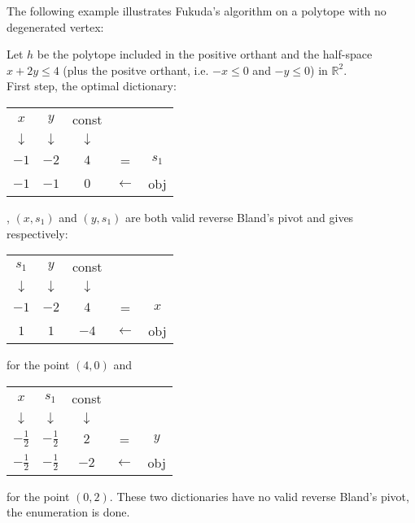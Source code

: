 The following example illustrates Fukuda's algorithm on a polytope with no degenerated vertex:

\begin{example}
	Let $h$ be the polytope included in the positive orthant and the half-space $x+2y\leq 4$ (plus the positve orthant, i.e. $-x\leq 0$ and $-y\leq 0$) in $\mathbb{R}^2$.\\
	First step, the optimal dictionary:
	\begin{tabular}{| c | c || c || c c |}
	\hline	
	$x$ & $y$ & const & & \\
	$\downarrow$ &$\downarrow$ &$\downarrow$ & & \\
	\hline
	\hline	
   	$-1$ & $-2$ & $4$ & = & $s_1$\\ \hline \hline	
   	$-1$ & $-1$ & $0$ & $\leftarrow$ & obj \\
   	\hline	
 	\end{tabular}, 
 	$(x,s_1)$ and $(y,s_1)$ are both valid reverse Bland's pivot and gives respectively:
 	\begin{tabular}{| c | c || c || c c |}
	\hline	
	$s_1$ & $y$ & const & & \\
	$\downarrow$ &$\downarrow$ &$\downarrow$ & & \\
	\hline
	\hline	
   	$-1$ & $-2$ & $4$ & = & $x$\\ \hline \hline	
   	$1$ & $1$ & $-4$ & $\leftarrow$ & obj \\
   	\hline	
 	\end{tabular}
 	for the point $(4,0)$ and
 	\begin{tabular}{| c | c || c || c c |}
	\hline	
	$x$ & $s_1$ & const & & \\
	$\downarrow$ &$\downarrow$ &$\downarrow$ & & \\
	\hline
	\hline	
   	$-\frac{1}{2}$ & $-\frac{1}{2}$ & $2$ & = & $y$\\ \hline \hline	
   	$-\frac{1}{2}$ & $-\frac{1}{2}$ & $-2$ & $\leftarrow$ & obj \\
   	\hline	
 	\end{tabular}
 	for the point $(0,2)$. These two dictionaries have no valid reverse Bland's pivot, the enumeration is done.
	\label{example-fukuda}
\end{example}

